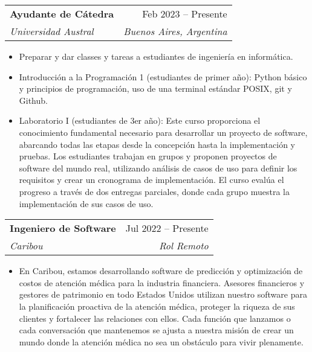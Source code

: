 \documentclass[letterpaper,11pt]{article}
\makeatletter
\newcommand{\resumeItem}[1]{
  \item\small{
    {#1 \vspace{-2pt}}
  }
}
\newcommand{\resumeSubheading}[4]{
  \vspace{-2pt}\item
    \begin{tabular*}{0.97\textwidth}[t]{l@{\extracolsep{\fill}}r}
      \textbf{#1} & #2 \\
      \textit{\small#3} & \textit{\small #4} \\
    \end{tabular*}\vspace{-7pt}
}
\newcommand{\resumeSubSubheading}[2]{
    \item
    \begin{tabular*}{0.97\textwidth}{l@{\extracolsep{\fill}}r}
      \textit{\small#1} & \textit{\small #2} \\
    \end{tabular*}\vspace{-7pt}
}
\newcommand{\resumeSubHeadingListEnd}{\end{itemize}}
\newcommand{\resumeItemListStart}{\begin{itemize}}
\newcommand{\resumeItemListEnd}{\end{itemize}\vspace{-5pt}}
\makeatother
\begin{document}
    \resumeSubheading
      {Ayudante de Cátedra}{Feb 2023 -- Presente}
      {Universidad Austral}{Buenos Aires, Argentina}
      \resumeItemListStart
        \resumeItem{Preparar y dar classes y tareas a estudiantes de ingeniería en informática.}
        \resumeItem{Introducción a la Programación 1 (estudiantes de primer año): Python básico y principios de programación, uso de una terminal estándar POSIX, git y Github.}
        \resumeItem{Laboratorio I (estudiantes de 3er año):
        Este curso proporciona el conocimiento fundamental necesario para desarrollar un proyecto de software, abarcando todas las etapas desde la concepción hasta la implementación y pruebas. Los estudiantes trabajan en grupos y proponen proyectos de software del mundo real, utilizando análisis de casos de uso para definir los requisitos y crear un cronograma de implementación. El curso evalúa el progreso a través de dos entregas parciales, donde cada grupo muestra la implementación de sus casos de uso.}
        \resumeItemListEnd
    \resumeSubheading
      {Ingeniero de Software}{Jul 2022 -- Presente}
      {Caribou}{Rol Remoto}
      \resumeItemListStart
        \resumeItem{En Caribou, estamos desarrollando software de predicción y optimización de costos de atención médica para la industria financiera. Asesores financieros y gestores de patrimonio en todo Estados Unidos utilizan nuestro software para la planificación proactiva de la atención médica, proteger la riqueza de sus clientes y fortalecer las relaciones con ellos. Cada función que lanzamos o cada conversación que mantenemos se ajusta a nuestra misión de crear un mundo donde la atención médica no sea un obstáculo para vivir plenamente.}
      \resumeItemListEnd
      
\end{document}
